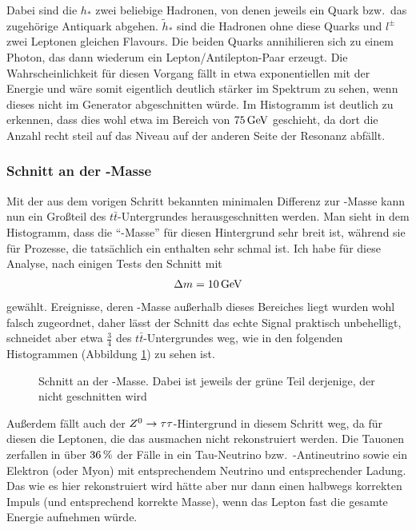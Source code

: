 Dabei sind die $h_*$ zwei beliebige Hadronen, von denen jeweils ein Quark bzw.\
das zugehörige Antiquark abgehen. $\tilde{h}_*$ sind die Hadronen ohne diese
Quarks und $l^\pm$ zwei Leptonen gleichen Flavours. Die beiden Quarks
annihilieren sich zu einem Photon, das dann wiederum ein Lepton/Antilepton-Paar
erzeugt. Die Wahrscheinlichkeit für diesen Vorgang fällt in etwa exponentiellen
mit der Energie und wäre somit eigentlich deutlich stärker im Spektrum zu sehen,
wenn dieses nicht im Generator abgeschnitten würde. Im Histogramm ist deutlich
zu erkennen, dass dies wohl etwa im Bereich von $\unit[75]{GeV}$ geschieht, da
dort die Anzahl recht steil auf das Niveau auf der anderen Seite der Resonanz
abfällt.

\subsubsection{Schnitt an der \Z-Masse}
Mit der aus dem vorigen Schritt bekannten minimalen Differenz zur \Z-Masse kann
nun ein Großteil des $t\bar{t}$-Untergrundes herausgeschnitten werden. Man sieht
in dem Histogramm, dass die "`\Z-Masse"' für diesen Hintergrund sehr breit ist,
während sie für Prozesse, die tatsächlich ein \Z enthalten sehr schmal ist. Ich
habe für diese Analyse, nach einigen Tests den Schnitt mit
\begin{align}
  \Delta m = \unit[10]{GeV}
\end{align}
gewählt. Ereignisse, deren
\Z-Masse außerhalb dieses Bereiches liegt wurden wohl falsch zugeordnet, daher
lässt der Schnitt das echte Signal praktisch unbehelligt, schneidet aber etwa
$\frac{3}{4}$ des $t\bar{t}$-Untergrundes weg, wie in den folgenden Histogrammen
(Abbildung \ref{fig:zmass_cut}) zu sehen ist.

\begin{figure}[htbp]
  \begin{center}
    
    \vfill
    
    \vfill
    
  \end{center}
    \caption{Schnitt an der \Z-Masse. Dabei ist jeweils der grüne Teil
    derjenige, der nicht geschnitten wird}
  \label{fig:zmass_cut}
\end{figure}

Außerdem fällt auch der $Z^0\to\tau\tau$-Hintergrund in diesem Schritt weg, da
für diesen die Leptonen, die das \Z ausmachen nicht rekonstruiert werden.  Die
Tauonen zerfallen in über $\unit[36]{\%}$ der Fälle in ein Tau-Neutrino bzw.\
-Antineutrino sowie ein Elektron (oder Myon) mit entsprechendem Neutrino und
entsprechender Ladung. Das \Z wie es hier rekonstruiert wird hätte aber nur dann
einen halbwegs korrekten Impuls (und entsprechend korrekte Masse), wenn das
Lepton fast die gesamte Energie aufnehmen würde.

